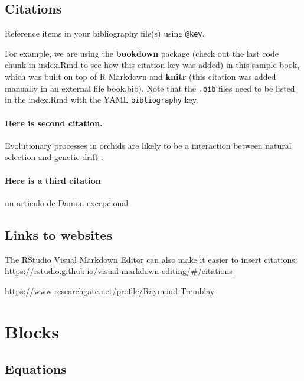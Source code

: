 \documentclass[
]{book}
\theoremstyle{definition}
\theoremstyle{definition}
\theoremstyle{definition}
\theoremstyle{definition}
\theoremstyle{remark}
\begin{document}
\section{Citations}\label{citations}

Reference items in your bibliography file(s) using \texttt{@key}.

For example, we are using the \textbf{bookdown} package \citep{R-bookdown} (check out the last code chunk in index.Rmd to see how this citation key was added) in this sample book, which was built on top of R Markdown and \textbf{knitr} \citep{xie2015} (this citation was added manually in an external file book.bib).
Note that the \texttt{.bib} files need to be listed in the index.Rmd with the YAML \texttt{bibliography} key.

\subsubsection{Here is second citation.}\label{here-is-second-citation.}

Evolutionary processes in orchids are likely to be a interaction between natural selection and genetic drift \citep{tremblay2005variation}.

\subsubsection{Here is a third citation}\label{here-is-a-third-citation}

un articulo de Damon excepcional \citep{damon2000review}

\section{Links to websites}\label{links-to-websites}

The RStudio Visual Markdown Editor can also make it easier to insert citations: \url{https://rstudio.github.io/visual-markdown-editing/\#/citations}

\url{https://www.researchgate.net/profile/Raymond-Tremblay}

\chapter{Blocks}\label{blocks}

\section{Equations}\label{equations}
\end{document}
